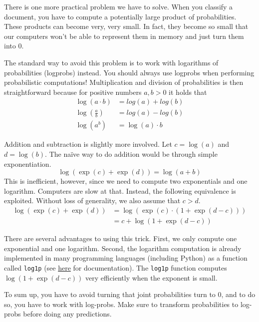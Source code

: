 \documentclass[11pt, a4paper]{article}
\begin{document}
There is one more practical problem we have to solve. When you classify a document, you have to compute a potentially large product of probabilities. These products can become very, very small. In fact, they become so small that our computers won't be able to 
represent them in memory and just turn them into 0.

The standard way to avoid this problem is to work with logarithms of probabilities (logprobs) instead. You should always use logprobs when performing
probabilistic computations! Multiplication and division of probabilities is then straightforward because for positive numbers $ a,b > 0 $ it holds that
\begin{align*}
\log(a \cdot b) &= log(a) + log(b) \\
\log\left( \frac{a}{b} \right) &= log(a) - log(b) \\
\log\left( a^{b} \right) &= \log(a) \cdot b
\end{align*}

Addition and subtraction is slightly more involved. Let $ c = \log(a) $ and $ d = \log(b) $. The na\"ive way to do addition would be through simple exponentiation.
\begin{equation*}
\log(\exp(c) + \exp(d)) = \log(a + b)
\end{equation*}
This is inefficient, however, since we need to compute two exponentials and one logarithm. Computers are slow at that. Instead, the 
following equivalence is exploited. Without loss of generality, we also assume that $ c > d $.
\begin{align*}
\log(\exp(c) + \exp(d)) &= \log(\exp(c) \cdot (1 + \exp(d-c)))  \\
&= c + \log(1 + \exp(d-c)) 
\end{align*}

There are several advantages to using this trick. First, we only compute one exponential and one logarithm. Second, the logarithm computation is already 
implemented in many programming languages (including Python) as a function called \texttt{log1p} (see \href{https://docs.python.org/3/library/math.html}{here} for documentation). The \texttt{log1p} function computes $ \log(1 + \exp(d-c)) $ very efficiently when the exponent is small.

To sum up, you have to avoid turning that joint probabilities turn to 0, and to do so, you have to work with log-probs. Make sure to transform probabilities to log-probs before doing any predictions.
\end{document}
